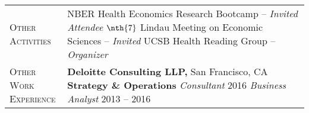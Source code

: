 \documentclass[11pt]{article}
\begin{document}
\begin{tabularx}{\textwidth}{@{}Y Z@{}}
	
	\textsc{Other \newline Activities} \vspace{20pt} & 
	NBER Health Economics Research Bootcamp -- \textit{Invited Attendee}
	\vspace{3pt} \newline
	$\nth{7}$ Lindau Meeting on Economic Sciences -- \textit{Invited}
	\vspace{3pt} \newline
	UCSB Health Reading Group -- \textit{Organizer}
	\\[20pt]
	

	\textsc{Other Work \newline Experience} \vspace{20pt} & 
	\textbf{Deloitte Consulting LLP,} San Francisco, CA
	\vspace{0pt} \newline
	\textbf{Strategy \& Operations} 
	\vspace{3pt} \newline
	\textit{Consultant} \hfill 2016
	\vspace{0pt} \newline
	\textit{Business Analyst} \hfill 2013 -- 2016
	\vspace{20pt} \\


\end{tabularx}
\end{document}
